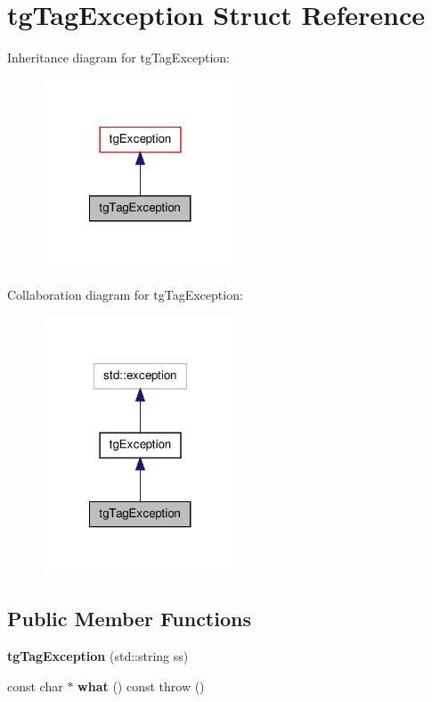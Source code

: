 \hypertarget{structtg_tag_exception}{\section{tg\-Tag\-Exception Struct Reference}
\label{structtg_tag_exception}
}


Inheritance diagram for tg\-Tag\-Exception\-:\nopagebreak
\begin{figure}[H]
\begin{center}
\leavevmode
\includegraphics[width=164pt]{structtg_tag_exception__inherit__graph}
\end{center}
\end{figure}


Collaboration diagram for tg\-Tag\-Exception\-:\nopagebreak
\begin{figure}[H]
\begin{center}
\leavevmode
\includegraphics[width=164pt]{structtg_tag_exception__coll__graph}
\end{center}
\end{figure}
\subsection*{Public Member Functions}
\begin{DoxyCompactItemize}
\item 
\hypertarget{structtg_tag_exception_af509a5bd15d97d897dc5e28d2aaee8c2}{{\bfseries tg\-Tag\-Exception} (std\-::string ss)}\label{structtg_tag_exception_af509a5bd15d97d897dc5e28d2aaee8c2}

\item 
\hypertarget{structtg_exception_a12edc2a009b7c96ea073e9d9c73f0ccd}{const char $\ast$ {\bfseries what} () const   throw ()}\label{structtg_exception_a12edc2a009b7c96ea073e9d9c73f0ccd}

\end{DoxyCompactItemize}
